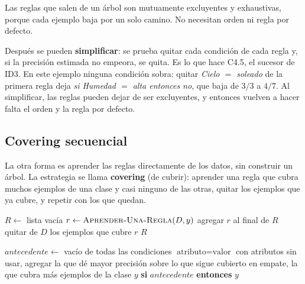 \documentclass[11pt,letterpaper]{article}
\begin{document}
Las reglas que salen de un árbol son mutuamente excluyentes y
exhaustivas, porque cada ejemplo baja por un solo camino. No necesitan
orden ni regla por defecto.

Después se pueden \textbf{simplificar}: se prueba quitar cada
condición de cada regla y, si la precisión estimada no empeora, se
quita. Es lo que hace C4.5, el sucesor de ID3. En este ejemplo ninguna
condición sobra: quitar \textit{Cielo $=$ soleado} de la primera regla
deja \textit{si Humedad $=$ alta entonces no}, que baja de $3/3$ a
$4/7$. Al simplificar, las reglas pueden dejar de ser excluyentes, y
entonces vuelven a hacer falta el orden y la regla por defecto.


\subsection*{Covering secuencial}

La otra forma es aprender las reglas directamente de los datos, sin
construir un árbol. La estrategia se llama \textbf{covering} (de
cubrir): aprender una regla que cubra muchos ejemplos de una clase y
casi ninguno de las otras, quitar los ejemplos que ya cubre, y repetir
con los que quedan.

\begin{algorithm}[H]
\caption{\textsc{Covering-Secuencial}$(D, y)$}
\begin{algorithmic}[1]
\State $R \gets$ lista vacía
  \State $r \gets \textsc{Aprender-Una-Regla}(D, y)$
  \State agregar $r$ al final de $R$
  \State quitar de $D$ los ejemplos que cubre $r$
\EndWhile
\State \Return $R$
\end{algorithmic}
\end{algorithm}

\begin{algorithm}[H]
\caption{\textsc{Aprender-Una-Regla}$(D, y)$}
\begin{algorithmic}[1]
\State $\mathit{antecedente} \gets$ vacío 
  \State de todas las condiciones $\text{atributo} = \text{valor}$ con
         atributos sin usar,
  \Statex \hspace{\algorithmicindent} agregar la que dé mayor
         precisión sobre lo que sigue cubierto
  \State en empate, la que cubra más ejemplos de la clase $y$
\EndWhile
\State \Return \textbf{si} $\mathit{antecedente}$ \textbf{entonces} $y$
\end{algorithmic}
\end{algorithm}
\end{document}
